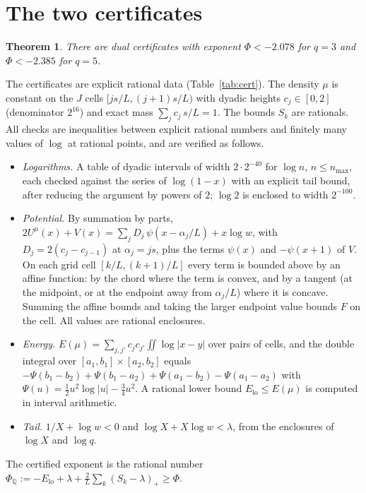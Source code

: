 \documentclass[11pt]{amsart}
\newtheorem{theorem}{Theorem}[section]
\theoremstyle{definition}
\theoremstyle{remark}
\numberwithin{equation}{section}
\begin{document}
\section{The two certificates}\label{sec:cert}

\begin{theorem}\label{thm:cert}
There are dual certificates with exponent $\Phi<-2.078$ for $q=3$ and $\Phi<-2.385$ for $q=5$.
\end{theorem}

The certificates are explicit rational data (Table~\ref{tab:cert}). The density $\mu$ is constant on the $J$ cells
$[js/L,(j+1)s/L)$ with dyadic heights $c_j\in[0,2]$ (denominator $2^{16}$) and exact mass
$\sum_jc_j\,s/L=1$. The bounds $S_k$ are rationals. All checks are inequalities between explicit rational numbers
and finitely many values of $\log$ at rational points, and are verified as follows.
\begin{itemize}
\item \emph{Logarithms.} A table of dyadic intervals of width $2\cdot2^{-40}$ for $\log n$, $n\le n_{\max}$, each checked
  against the series of $\log(1-x)$ with an explicit tail bound, after reducing the argument by powers of $2$; $\log2$
  is enclosed to width $2^{-100}$.
\item \emph{Potential.} By summation by parts,
  $2U^\mu(x)+V(x)=\sum_jD_j\,\psi(x-\alpha_j/L)+x\log w$, with $D_j=2(c_j-c_{j-1})$ at $\alpha_j=js$, plus the terms
  $\psi(x)$ and $-\psi(x+1)$ of $V$. On each grid cell $[k/L,(k+1)/L]$ every term is bounded above by an affine
  function: by the chord where the term is convex, and by a tangent (at the midpoint, or at the endpoint away from
  $\alpha_j/L$) where it is concave. Summing the affine bounds and taking the larger endpoint value bounds $F$ on the
  cell. All values are rational enclosures.
\item \emph{Energy.} $E(\mu)=\sum_{j,j'}c_jc_{j'}\iint\log|x-y|$ over pairs of cells, and the double integral over
  $[a_1,b_1]\times[a_2,b_2]$ equals $-\Psi(b_1-b_2)+\Psi(b_1-a_2)+\Psi(a_1-b_2)-\Psi(a_1-a_2)$ with
  $\Psi(u)=\frac12u^2\log|u|-\frac34u^2$. A rational lower bound $E_{\mathrm{lo}}\le E(\mu)$ is computed in interval
  arithmetic.
\item \emph{Tail.} $1/X+\log w<0$ and $\log X+X\log w<\lambda$, from the enclosures of $\log X$ and $\log q$.
\end{itemize}
The certified exponent is the rational number $\Phi_{\mathbb Q}:=-E_{\mathrm{lo}}+\lambda+\frac2L\sum_k(S_k-\lambda)_+\ge\Phi$.
\end{document}

